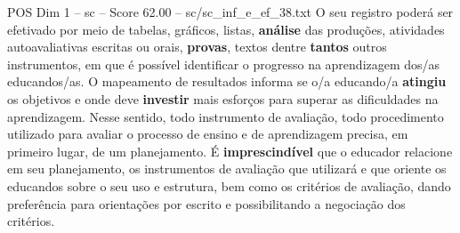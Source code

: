 \begin{textsample}{POS Dim 1 – sc – Score 62.00 – sc/sc\_inf\_e\_ef\_38.txt}
O seu registro poderá ser efetivado por meio de tabelas, gráficos, listas, \textbf{análise} das produções, atividades autoavaliativas escritas ou orais, \textbf{provas}, textos dentre \textbf{tantos} outros instrumentos, em que é possível identificar o progresso na aprendizagem dos/as educandos/as.
O mapeamento de resultados informa se o/a educando/a \textbf{atingiu} os objetivos e onde deve \textbf{investir} mais esforços para superar as dificuldades na aprendizagem.
Nesse sentido, todo instrumento de avaliação, todo procedimento utilizado para avaliar o processo de ensino e de aprendizagem precisa, em primeiro lugar, de um planejamento.
É \textbf{imprescindível} que o educador relacione em seu planejamento, os instrumentos de avaliação que utilizará e que oriente os educandos sobre o seu uso e estrutura, bem como os critérios de avaliação, dando preferência para orientações por escrito e possibilitando a negociação dos critérios.

\end{textsample}
